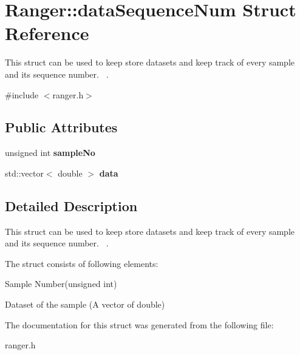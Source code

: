 \hypertarget{struct_ranger_1_1data_sequence_num}{}\section{Ranger\+:\+:data\+Sequence\+Num Struct Reference}
\label{struct_ranger_1_1data_sequence_num}


This struct can be used to keep store datasets and keep track of every sample and its sequence number.~\newline
.  




{\ttfamily \#include $<$ranger.\+h$>$}

\subsection*{Public Attributes}
\begin{DoxyCompactItemize}
\item 
unsigned int {\bfseries sample\+No}\hypertarget{struct_ranger_1_1data_sequence_num_a445b538f2723e28ecd491e7134aebf2a}{}\label{struct_ranger_1_1data_sequence_num_a445b538f2723e28ecd491e7134aebf2a}

\item 
std\+::vector$<$ double $>$ {\bfseries data}\hypertarget{struct_ranger_1_1data_sequence_num_ae830d296270962774b3958c2ab3e7e4d}{}\label{struct_ranger_1_1data_sequence_num_ae830d296270962774b3958c2ab3e7e4d}

\end{DoxyCompactItemize}


\subsection{Detailed Description}
This struct can be used to keep store datasets and keep track of every sample and its sequence number.~\newline
. 

The struct consists of following elements\+:~\newline

\begin{DoxyItemize}
\item Sample Number(unsigned int)~\newline

\item Dataset of the sample (A vector of double)~\newline

\end{DoxyItemize}

The documentation for this struct was generated from the following file\+:\begin{DoxyCompactItemize}
\item 
ranger.\+h\end{DoxyCompactItemize}

